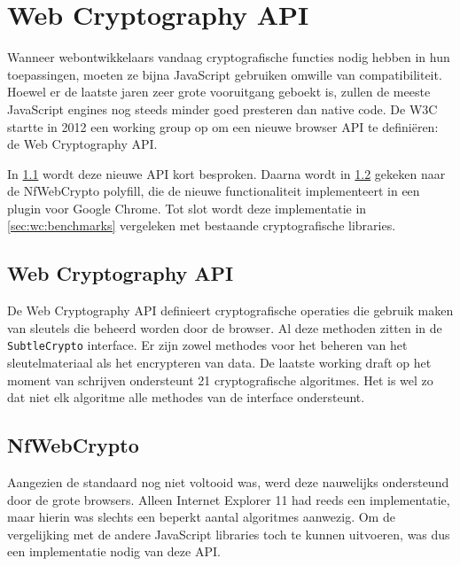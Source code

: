 % 
%

\chapter{Web Cryptography API}
\label{chap:web_cryptography_api}

Wanneer webontwikkelaars vandaag cryptografische functies nodig hebben in hun toepassingen, moeten ze bijna JavaScript gebruiken omwille van compatibiliteit. Hoewel er de laatste jaren zeer grote vooruitgang geboekt is, zullen de meeste JavaScript engines nog steeds minder goed presteren dan native code.\cite{site:resig_javascript_performance_rundown}\cite{site:cois_javascript_performance_rundown_2012}\cite{smedberg_performance_analysis_of_javascript} De W3C startte in 2012 een working group op om een nieuwe browser API te defini\"eren: de Web Cryptography API.\cite{wiki:webcrypto}

\npar In \ref{sec:wc:wb_cryptography_api} wordt deze nieuwe API kort besproken. Daarna wordt in \ref{sec:wc:nfwebcrypto} gekeken naar de NfWebCrypto polyfill, die de nieuwe functionaliteit implementeert in een plugin voor Google Chrome. Tot slot wordt deze implementatie in \ref{sec:wc:benchmarks} vergeleken met bestaande cryptografische libraries.

\section{Web Cryptography API~\cite{sleevi_watson_web_cryptography_api}}
\label{sec:wc:wb_cryptography_api}

De Web Cryptography API definieert cryptografische operaties die gebruik maken van sleutels die beheerd worden door de browser. Al deze methoden zitten in de \texttt{SubtleCrypto} interface. Er zijn zowel methodes voor het beheren van het sleutelmateriaal als het encrypteren van data. De laatste working draft op het moment van schrijven ondersteunt 21 cryptografische algoritmes. Het is wel zo dat niet elk algoritme alle methodes van de interface ondersteunt.


\section{NfWebCrypto}
\label{sec:wc:nfwebcrypto}

Aangezien de standaard nog niet voltooid was, werd deze nauwelijks ondersteund door de grote browsers.\cite{site:html5test_web_cryptography_api} Alleen Internet Explorer 11 had reeds een implementatie, maar hierin was slechts een beperkt aantal algoritmes aanwezig.\cite{site:microsoft_web_cryptography} Om de vergelijking met de andere JavaScript libraries toch te kunnen uitvoeren, was dus een implementatie nodig van deze API.

